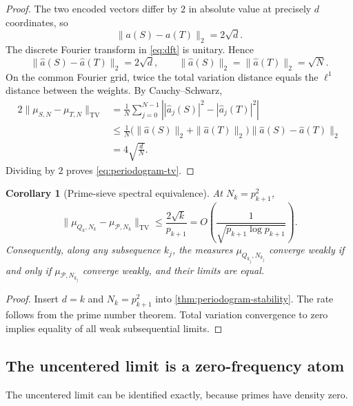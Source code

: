 \documentclass[11pt]{article}
\newtheorem{corollary}[theorem]{Corollary}
\theoremstyle{definition}
\theoremstyle{remark}
\newcommand{\cP}{\mathcal{P}}
\newcommand{\TV}{\mathrm{TV}}
\begin{document}
\begin{proof}
The two encoded vectors differ by $2$ in absolute value at precisely $d$ coordinates, so
\[
    \|a(S)-a(T)\|_2=2\sqrt d.
\]
The discrete Fourier transform in \eqref{eq:dft} is unitary.  Hence
\begin{equation}\label{eq:parseval-difference}
    \|\widehat a(S)-\widehat a(T)\|_2=2\sqrt d,
    \qquad
    \|\widehat a(S)\|_2=\|\widehat a(T)\|_2=\sqrt N.
\end{equation}
On the common Fourier grid, twice the total variation distance equals the $\ell^1$ distance between the weights.  By Cauchy--Schwarz,
\begin{align*}
    2\|\mu_{S,N}-\mu_{T,N}\|_{\TV}
    &=\frac1N\sum_{j=0}^{N-1}
      \left||\widehat a_j(S)|^2-|\widehat a_j(T)|^2\right|\\
    &\le\frac1N
      \bigl(\|\widehat a(S)\|_2+\|\widehat a(T)\|_2\bigr)
      \|\widehat a(S)-\widehat a(T)\|_2\\
    &=4\sqrt{\frac dN}.
\end{align*}
Dividing by $2$ proves \eqref{eq:periodogram-tv}.
\end{proof}

\begin{corollary}[Prime-sieve spectral equivalence]\label{cor:prime-periodogram}
At $N_k=p_{k+1}^2$,
\begin{equation}\label{eq:prime-periodogram}
    \|\mu_{Q_k,N_k}-\mu_{\cP,N_k}\|_{\TV}
    \le\frac{2\sqrt{k}}{p_{k+1}}
    =O\!\left(\frac1{\sqrt{p_{k+1}\log p_{k+1}}}\right).
\end{equation}
Consequently, along any subsequence $k_j$, the measures $\mu_{Q_{k_j},N_{k_j}}$ converge weakly if and only if $\mu_{\cP,N_{k_j}}$ converge weakly, and their limits are equal.
\end{corollary}

\begin{proof}
Insert $d=k$ and $N_k=p_{k+1}^2$ into \cref{thm:periodogram-stability}.  The rate follows from the prime number theorem.  Total variation convergence to zero implies equality of all weak subsequential limits.
\end{proof}

\subsection{The uncentered limit is a zero-frequency atom}

The uncentered limit can be identified exactly, because primes have density zero.
\end{document}

